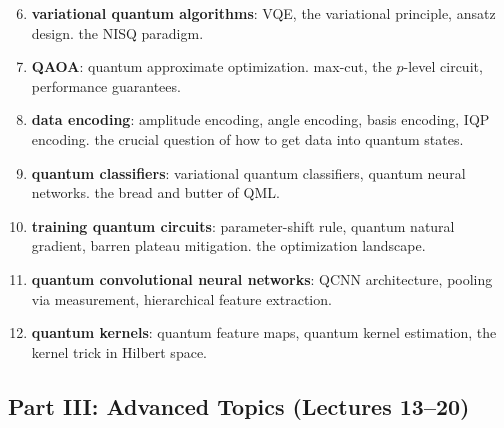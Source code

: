 \documentclass[11pt,a4paper]{article}
\theoremstyle{definition}
\theoremstyle{remark}
\begin{document}
\begin{enumerate}[label=\textbf{Lec \arabic*:}]
    \setcounter{enumi}{5}
    \item \textbf{variational quantum algorithms}: VQE, the variational principle, ansatz design. the NISQ paradigm.

    \item \textbf{QAOA}: quantum approximate optimization. max-cut, the $p$-level circuit, performance guarantees.

    \item \textbf{data encoding}: amplitude encoding, angle encoding, basis encoding, IQP encoding. the crucial question of how to get data into quantum states.

    \item \textbf{quantum classifiers}: variational quantum classifiers, quantum neural networks. the bread and butter of QML.

    \item \textbf{training quantum circuits}: parameter-shift rule, quantum natural gradient, barren plateau mitigation. the optimization landscape.

    \item \textbf{quantum convolutional neural networks}: QCNN architecture, pooling via measurement, hierarchical feature extraction.

    \item \textbf{quantum kernels}: quantum feature maps, quantum kernel estimation, the kernel trick in Hilbert space.
\end{enumerate}

\subsection{Part III: Advanced Topics (Lectures 13--20)}
\end{document}
